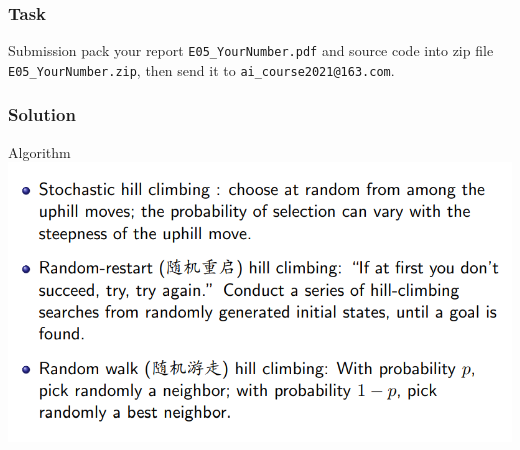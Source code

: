 \documentclass{beamer}
\begin{document}
\begin{frame}
  \frametitle{Task}
  \begin{block}{Submission}
    pack your report \texttt{E05\_YourNumber.pdf} and source code into zip file \texttt{E05\_YourNumber.zip}, then send it to \texttt{ai\_course2021@163.com}.
  \end{block}
\end{frame}

\begin{frame}
  \frametitle{Solution}
  Algorithm
  \includegraphics[width=1.0\textwidth]{Pic/algorithm}
\end{frame}
\end{document}
